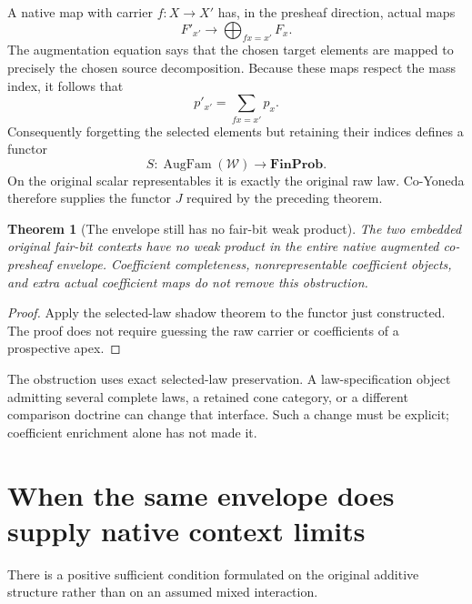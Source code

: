 \documentclass[11pt]{article}
\newtheorem{theorem}{Theorem}
\newcommand{\W}{\mathcal W}
\newcommand{\Aug}{\operatorname{AugFam}}
\begin{document}
A native map with carrier $f:X\to X'$ has, in the presheaf direction, actual maps
\[
 F'_{x'}\longrightarrow\bigoplus_{fx=x'}F_x.
\]
The augmentation equation says that the chosen target elements are mapped to precisely the chosen source decomposition. Because these maps respect the mass index, it follows that
\[
 p'_{x'}=\sum_{fx=x'}p_x.
\]
Consequently forgetting the selected elements but retaining their indices defines a functor
\[
 S:\Aug(\W)\longrightarrow\mathbf{FinProb}.
\]
On the original scalar representables it is exactly the original raw law. Co-Yoneda therefore supplies the functor $J$ required by the preceding theorem.

\begin{theorem}[The envelope still has no fair-bit weak product]
The two embedded original fair-bit contexts have no weak product in the entire native augmented co-presheaf envelope. Coefficient completeness, nonrepresentable coefficient objects, and extra actual coefficient maps do not remove this obstruction.
\end{theorem}
\begin{proof}
Apply the selected-law shadow theorem to the functor just constructed. The proof does not require guessing the raw carrier or coefficients of a prospective apex.
\end{proof}
The obstruction uses exact selected-law preservation. A law-specification object admitting several complete laws, a retained cone category, or a different comparison doctrine can change that interface. Such a change must be explicit; coefficient enrichment alone has not made it.

\section{When the same envelope does supply native context limits}
There is a positive sufficient condition formulated on the original additive structure rather than on an assumed mixed interaction.
\end{document}
